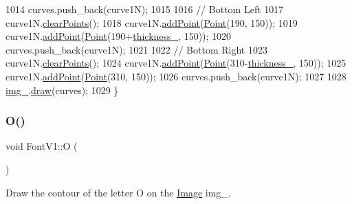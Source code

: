 \begin{DoxyCode}
1014     curves.push\_back(curve1N);
1015 
1016     \textcolor{comment}{// Bottom Left}
1017     curve1N.\mbox{\hyperlink{class_bezier_curve_a0ba8ce66d5af5971ae6a1b506029728e}{clearPoints}}();
1018     curve1N.\mbox{\hyperlink{class_bezier_curve_a38d16c18b36ae45619b05e26e226cf34}{addPoint}}(\mbox{\hyperlink{class_point}{Point}}(190, 150));
1019     curve1N.\mbox{\hyperlink{class_bezier_curve_a38d16c18b36ae45619b05e26e226cf34}{addPoint}}(\mbox{\hyperlink{class_point}{Point}}(190+\mbox{\hyperlink{class_font_v1_aed8040e76be9a52833627b92f0fb4e5f}{thickness\_}}, 150));
1020     curves.push\_back(curve1N);
1021 
1022     \textcolor{comment}{// Bottom Right}
1023     curve1N.\mbox{\hyperlink{class_bezier_curve_a0ba8ce66d5af5971ae6a1b506029728e}{clearPoints}}();
1024     curve1N.\mbox{\hyperlink{class_bezier_curve_a38d16c18b36ae45619b05e26e226cf34}{addPoint}}(\mbox{\hyperlink{class_point}{Point}}(310-\mbox{\hyperlink{class_font_v1_aed8040e76be9a52833627b92f0fb4e5f}{thickness\_}}, 150));
1025     curve1N.\mbox{\hyperlink{class_bezier_curve_a38d16c18b36ae45619b05e26e226cf34}{addPoint}}(\mbox{\hyperlink{class_point}{Point}}(310, 150));
1026     curves.push\_back(curve1N);
1027 
1028     \mbox{\hyperlink{class_font_v1_a00569e3e3c4b70f437b63f396f735fb0}{img\_}}.\mbox{\hyperlink{class_image_a8d162f3cab956131d58708c09aa560b0}{draw}}(curves);
1029 \}
\end{DoxyCode}
\mbox{\label{class_font_v1_a9338f8d780e9913a848310355973ebf3}} 
\subsubsection{\texorpdfstring{O()}{O()}}
{\footnotesize\ttfamily void Font\+V1\+::O (\begin{DoxyParamCaption}{ }\end{DoxyParamCaption})}



Draw the contour of the letter O on the \mbox{\hyperlink{class_image}{Image}} img\+\_\+. 


